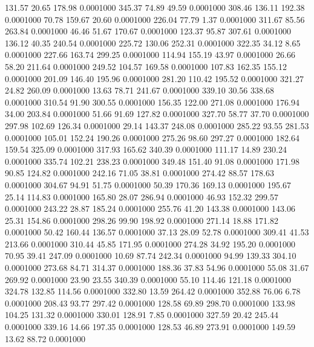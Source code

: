  131.57   20.65  178.98   0.0001000
 345.37   74.89   49.59   0.0001000
 308.46  136.11  192.38   0.0001000
  70.78  159.67   20.60   0.0001000
 226.04   77.79    1.37   0.0001000
 311.67   85.56  263.84   0.0001000
  46.46   51.67  170.67   0.0001000
 123.37   95.87  307.61   0.0001000
 136.12   40.35  240.54   0.0001000
 225.72  130.06  252.31   0.0001000
 322.35   34.12    8.65   0.0001000
 227.66  163.74  299.25   0.0001000
 114.94  155.19   43.97   0.0001000
  26.66   58.20  211.64   0.0001000
 249.52  104.57  169.58   0.0001000
 107.83  162.35  155.12   0.0001000
 201.09  146.40  195.96   0.0001000
 281.20  110.42  195.52   0.0001000
 321.27   24.82  260.09   0.0001000
  13.63   78.71  241.67   0.0001000
 339.10   30.56  338.68   0.0001000
 310.54   91.90  300.55   0.0001000
 156.35  122.00  271.08   0.0001000
 176.94   34.00  203.84   0.0001000
  51.66   91.69  127.82   0.0001000
 327.70   58.77   37.70   0.0001000
 297.98  102.69  126.34   0.0001000
  29.14  143.37  248.08   0.0001000
 285.22   93.55  281.53   0.0001000
 105.01  152.24  190.26   0.0001000
 275.26   98.60  297.27   0.0001000
 182.64  159.54  325.09   0.0001000
 317.93  165.62  340.39   0.0001000
 111.17   14.89  230.24   0.0001000
 335.74  102.21  238.23   0.0001000
 349.48  151.40   91.08   0.0001000
 171.98   90.85  124.82   0.0001000
 242.16   71.05   38.81   0.0001000
 274.42   88.57  178.63   0.0001000
 304.67   94.91   51.75   0.0001000
  50.39  170.36  169.13   0.0001000
 195.67   25.14  114.83   0.0001000
 165.80   28.07  286.94   0.0001000
  46.93  152.32  299.57   0.0001000
 243.22   28.87  185.24   0.0001000
 255.76   41.20  143.38   0.0001000
 143.06   25.31  154.86   0.0001000
 298.26   99.90  198.92   0.0001000
 271.14   18.88  171.82   0.0001000
  50.42  160.44  136.57   0.0001000
  37.13   28.09   52.78   0.0001000
 309.41   41.53  213.66   0.0001000
 310.44   45.85  171.95   0.0001000
 274.28   34.92  195.20   0.0001000
  70.95   39.41  247.09   0.0001000
  10.69   87.74  242.34   0.0001000
  94.99  139.33  304.10   0.0001000
 273.68   84.71  314.37   0.0001000
 188.36   37.83   54.96   0.0001000
  55.08   31.67  269.92   0.0001000
  23.90   23.55  340.39   0.0001000
  55.10  114.46  121.18   0.0001000
 324.78  132.85  114.56   0.0001000
 332.80   13.59  264.42   0.0001000
 352.88   76.06    6.78   0.0001000
 208.43   93.77  297.42   0.0001000
 128.58   69.89  298.70   0.0001000
 133.98  104.25  131.32   0.0001000
 330.01  128.91    7.85   0.0001000
 327.59   20.42  245.44   0.0001000
 339.16   14.66  197.35   0.0001000
 128.53   46.89  273.91   0.0001000
 149.59   13.62   88.72   0.0001000
